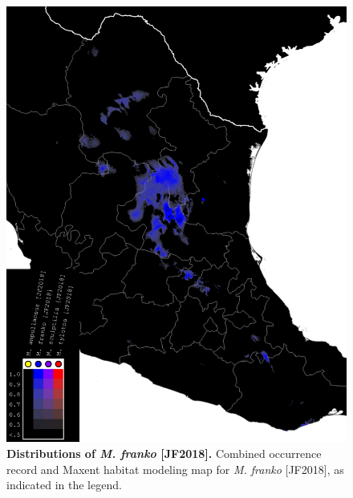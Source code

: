 \documentclass[fleqn,10pt,lineno]{wlpeerj} %
\begin{document}
\begin{figure}[h]
	\centering
	\includegraphics[width=\textwidth]{figure37.png}
	\caption{\textbf{Distributions of \textit{M. franko} [JF2018].} Combined occurrence record and Maxent habitat modeling map for \textit{M. franko} [JF2018], as indicated in the legend.}
	\label{fig:map_franko}
\end{figure}
\end{document}

